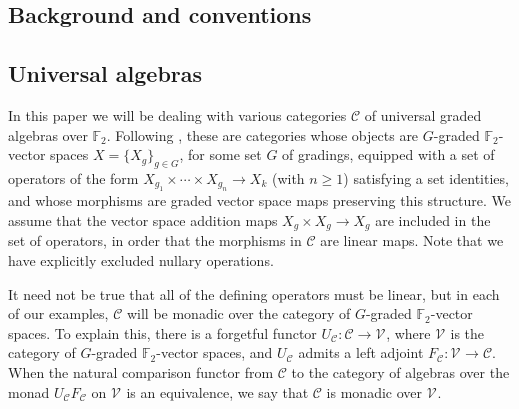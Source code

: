 \documentclass[11pt]{amsart}
\theoremstyle{plain}
\theoremstyle{definition}
\renewcommand{\to}{\longrightarrow}
\newcommand{\calC}{\mathcal{C}}
\newcommand{\calV}{\mathcal{V}}
\theoremstyle{plain}
\newcommand{\vect}[2]{\calV^{#1}_{#2}}
\newcommand{\F}{\mathbb{F}}
\begin{document}
\begin{Conventions and notation}
\section{\textbf{Background and conventions}}

\subsection{Universal algebras}\label{Universal algebras}
In this paper we will be dealing with various categories $\calC$ of universal graded algebras over $\F_2$. Following \cite[\S2.1]{Blanc_Stover-Groth_SS.pdf}, these are categories whose objects are $G$-graded $\F_2$-vector spaces $X=\{X_g\}_{g\in G}$, for some set $G$ of gradings, equipped with a set of operators of the form $X_{g_1}\times \cdots \times X_{g_n}\to X_k$ (with $n\geq1$)  satisfying a set identities, and whose morphisms are graded vector space maps preserving this structure. We assume that the vector space addition  maps $X_g\times X_g\to X_{g}$ are included in the set of operators, in order that the morphisms in $\calC$ are linear maps. Note that we have explicitly excluded nullary operations. 

It need not  be true that all of the defining operators must be linear, but in each of our examples, $\calC$ will be monadic over the category of $G$-graded $\F_2$-vector spaces. To explain this, there is a forgetful functor $U_\calC:\calC\to\vect{}{}$, where $\vect{}{}$ is the category of $G$-graded $\F_2$-vector spaces, and $U_{\calC}$ admits a left adjoint  $F_\calC:\vect{}{}\to\calC$. %
When the natural comparison functor from $\calC$ to the category of algebras over the monad $U_{\calC}F_{\calC}$ on $\vect{}{}$ is an equivalence, we say that $\calC$ is monadic over $\vect{}{}$.


\end{Conventions and notation}
\end{document}
